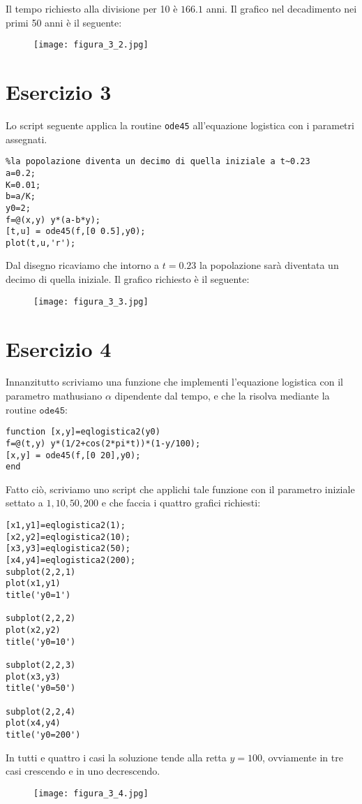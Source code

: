 \documentclass{article}
\begin{document}
\noindent
Il tempo richiesto alla divisione per 10 è $166.1$ anni. Il grafico nel decadimento nei primi 50 anni è il seguente:

\begin{figure}[!h]
\centering
\texttt{[image: figura\_3\_2.jpg]}
\end{figure}

\newpage

\section*{Esercizio 3}

Lo script seguente applica la routine \texttt{ode45} all'equazione logistica con i parametri assegnati.
\begin{lstlisting}
%la popolazione diventa un decimo di quella iniziale a t~0.23 
a=0.2;
K=0.01;
b=a/K;
y0=2;
f=@(x,y) y*(a-b*y);
[t,u] = ode45(f,[0 0.5],y0);
plot(t,u,'r');
\end{lstlisting}

\noindent
Dal disegno ricaviamo che intorno a $t=0.23$ la popolazione sarà diventata un decimo di quella iniziale.
Il grafico richiesto è il seguente:

\begin{figure}[!h]
\centering
\texttt{[image: figura\_3\_3.jpg]}
\end{figure}

\newpage

\section*{Esercizio 4}

Innanzitutto scriviamo una funzione che implementi l'equazione logistica con il parametro mathusiano $\alpha$ dipendente dal tempo, e che la risolva mediante la routine $\texttt{ode45}$:
\begin{lstlisting}
function [x,y]=eqlogistica2(y0)
f=@(t,y) y*(1/2+cos(2*pi*t))*(1-y/100);
[x,y] = ode45(f,[0 20],y0);
end
\end{lstlisting}

\noindent
Fatto ciò, scriviamo uno script che applichi tale funzione con il parametro iniziale settato a $1, 10, 50, 200$ e che faccia i quattro grafici richiesti:

\begin{lstlisting}
[x1,y1]=eqlogistica2(1);
[x2,y2]=eqlogistica2(10);
[x3,y3]=eqlogistica2(50);
[x4,y4]=eqlogistica2(200);
subplot(2,2,1) 
plot(x1,y1)
title('y0=1')

subplot(2,2,2) 
plot(x2,y2)
title('y0=10')

subplot(2,2,3) 
plot(x3,y3)
title('y0=50')

subplot(2,2,4) 
plot(x4,y4)
title('y0=200')
\end{lstlisting}

\noindent
In tutti e quattro i casi la soluzione tende alla retta $y=100$, ovviamente in tre casi crescendo e in uno decrescendo.

\begin{figure}[!h]
\centering
\texttt{[image: figura\_3\_4.jpg]}
\end{figure}
\end{document}

